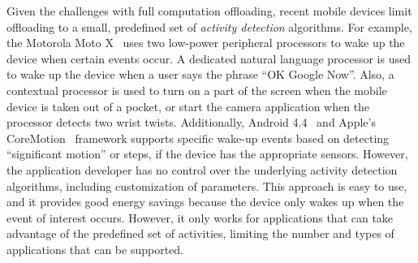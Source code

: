 Given the challenges with full computation offloading, recent mobile
devices limit offloading to a small, predefined set of \emph{activity
detection} algorithms.  For example, the Motorola Moto X~\cite{motox}
uses two low-power peripheral processors to wake up the device when
certain events occur.  A dedicated natural language processor is used
to wake up the device when a user says the phrase ``OK Google Now''.  Also, 
a contextual processor is used to turn on a part of the screen
when the mobile device is taken out of a pocket, or start the camera
application when the processor detects two wrist twists.  Additionally, 
Android 4.4~\cite{android4.4} and Apple's CoreMotion~\cite{coreMotion} framework supports specific wake-up
events based on detecting ``significant motion'' or steps, if the device
has the appropriate sensors.  However, the application developer has no
control over the underlying activity detection algorithms, including
customization of parameters.  This approach is easy to use, and it
provides good energy savings because the device only wakes up when the
event of interest occurs.  However, it only works for applications that
can take advantage of the predefined set of activities, limiting the
number and types of applications that can be supported.

